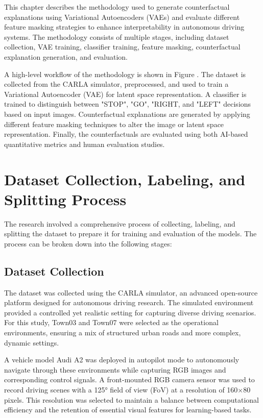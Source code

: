 This chapter describes the methodology used to generate counterfactual explanations using Variational Autoencoders (VAEs) and evaluate different feature masking strategies to enhance interpretability in autonomous driving systems. The methodology consists of multiple stages, including dataset collection, VAE training, classifier training, feature masking, counterfactual explanation generation, and evaluation.

A high-level workflow of the methodology is shown in Figure . The dataset is collected from the CARLA simulator, preprocessed, and used to train a Variational Autoencoder (VAE) for latent space representation. A classifier is trained to distinguish between "STOP", "GO", "RIGHT, and "LEFT" decisions based on input images. Counterfactual explanations are generated by applying different feature masking techniques to alter the image or latent space representation. Finally, the counterfactuals are evaluated using both AI-based quantitative metrics and human evaluation studies.

\section{Dataset Collection, Labeling, and Splitting Process}
The research involved a comprehensive process of collecting, labeling, and splitting the dataset to prepare it for training and evaluation of the models. The process can be broken down into the following stages:

\subsection{Dataset Collection}
The dataset was collected using the CARLA simulator, an advanced open-source platform designed for autonomous driving research. The simulated environment provided a controlled yet realistic setting for capturing diverse driving scenarios. For this study, Town03 and Town07 were selected as the operational environments, ensuring a mix of structured urban roads and more complex, dynamic settings.

A vehicle model Audi A2 was deployed in autopilot mode to autonomously navigate through these environments while capturing RGB images and corresponding control signals. A front-mounted RGB camera sensor was used to record driving scenes with a 125° field of view (FoV) at a resolution of 160×80 pixels. This resolution was selected to maintain a balance between computational efficiency and the retention of essential visual features for learning-based tasks.

